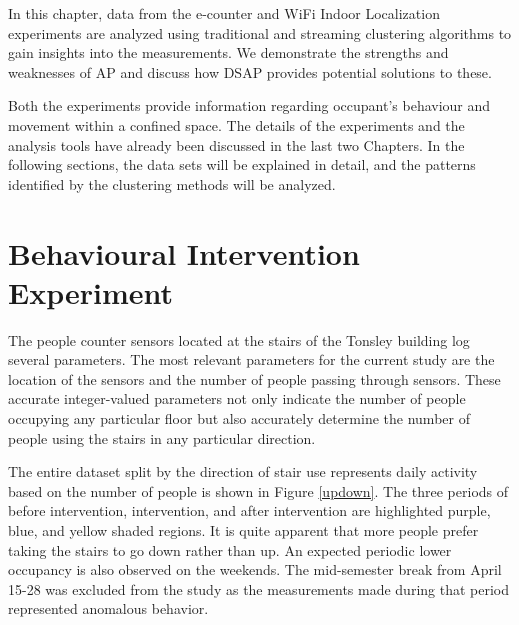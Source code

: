In this chapter, data from the e-counter and WiFi Indoor Localization experiments are analyzed using traditional and streaming clustering algorithms to gain insights into the measurements. We demonstrate the strengths and weaknesses of AP and discuss how DSAP provides potential solutions to these.

Both the experiments provide information regarding occupant's behaviour and movement within a confined space. The details of the experiments and the analysis tools have already been discussed in the last two Chapters. In the following sections, the data sets will be explained in detail, and the patterns identified by the clustering methods will be analyzed.

 
\section{Behavioural Intervention Experiment} 


The people counter sensors located at the stairs of the Tonsley building log several parameters. The most relevant parameters for the current study are the location of the sensors and the number of people passing through sensors. These accurate integer-valued parameters not only indicate the number of people occupying any particular floor but also accurately determine the number of people using the stairs in any particular direction.

The entire dataset split by the direction of stair use represents daily activity based on the number of people is shown in Figure \ref{updown}. The three periods of before intervention, intervention, and after intervention are highlighted purple, blue, and yellow shaded regions. It is quite apparent that more people prefer taking the stairs to go down rather than up. An expected periodic lower occupancy is also observed on the weekends. The mid-semester break from April 15-28 was excluded from the study as the measurements made during that period represented anomalous behavior.

